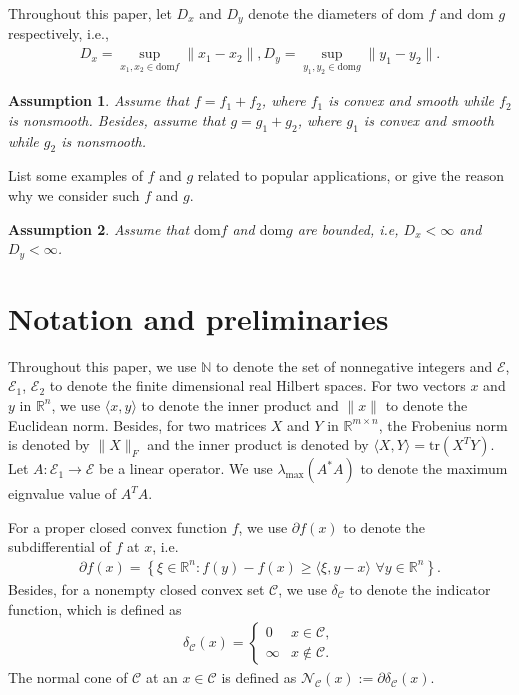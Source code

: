 \documentclass{article}
\numberwithin{equation}{section}
\newtheorem{assumption}{Assumption}[section]
\begin{document}
Throughout this paper, let $D_x$ and $D_y$ denote the diameters of $\mathrm{dom}$ $f$ 
and $\mathrm{dom}$ $g$ respectively, i.e.,
\begin{align} \label{Definition_of_diameter}
    D_x = \sup\limits_{x_1,x_2\in \mathrm{dom}f}\|x_1 -x_2\rVert,
    D_y = \sup\limits_{y_1,y_2\in \mathrm{dom}g}\|y_1 -y_2\rVert.
\end{align}

\begin{assumption} \label{Assumption 1}
    Assume that $f = f_1 +f_2$, 
    where $f_1$ is convex and smooth while $f_2$ is nonsmooth.
    Besides, assume that   
    $g = g_1 +g_2$, where $g_1$ is convex and smooth while $g_2$ is nonsmooth. 
\end{assumption}

{\color{blue}List some examples of $ f $ and $ g $ related to popular applications, or give the reason why we consider such $ f $ and $ g $.}

\begin{assumption} \label{Assumption 2}
    Assume that $\mathrm{dom} f$ and $\mathrm{dom} g$ are bounded, i.e, $D_x<\infty$ and $D_y < \infty$. 
\end{assumption}

\section{Notation and preliminaries}
Throughout this paper, we use $\mathbb{N}$ to denote the set of nonnegative integers and $\mathcal{E}$, $\mathcal{E}_1$, $\mathcal{E}_2$ to denote the 
finite dimensional real Hilbert spaces. For two vectors $x$ and $y$ in $\mathbb{R}^n$, we use $\langle x,y\rangle$
to denote the inner product and $\|x\rVert$ to denote the Euclidean norm. Besides, for two matrices 
$X$ and $Y$ in $\mathbb{R}^{m\times n}$, the Frobenius norm is denoted by $\|X\rVert_F$ and 
the inner product is denoted by $\langle X,Y \rangle =\mathrm{tr}\left(X^TY\right)$.
Let $A: \mathcal{E}_1\rightarrow \mathcal{E}$ be a linear operator. We use $\lambda_{\max}(A^*A)$ to denote the maximum eignvalue value of $A^TA  $.

For a proper closed convex function $f$, we use $\partial f(x)$ to denote the subdifferential of $f$ at $x$, 
i.e.
\begin{align}
    \partial f(x) = \left\{\xi \in \mathbb{R}^n: f(y)- f(x) \geq\langle \xi, y-x \rangle \hspace{4pt} \forall y \in \mathbb{R}^n\right\}. 
    \nonumber
\end{align}
Besides, for a nonempty closed convex set $\mathcal{C}$, we use $\delta_{\mathcal{C}}$ to denote the indicator function, which
is defined as 
\begin{align}
    \delta_{\mathcal{C}}(x) = \left\{ 
        \begin{array}{cc}
            0  & x\in \mathcal{C},  \nonumber \\
            \infty & x \notin \mathcal{C}.  \nonumber
        \end{array}
     \right.  \nonumber
\end{align}
The normal cone of $\mathcal{C}$ at an $x\in\mathcal{C}$ is 
defined as $\mathcal{N}_{\mathcal{C}}(x):=\partial\delta_{\mathcal{C}}(x)$. 
\end{document}

